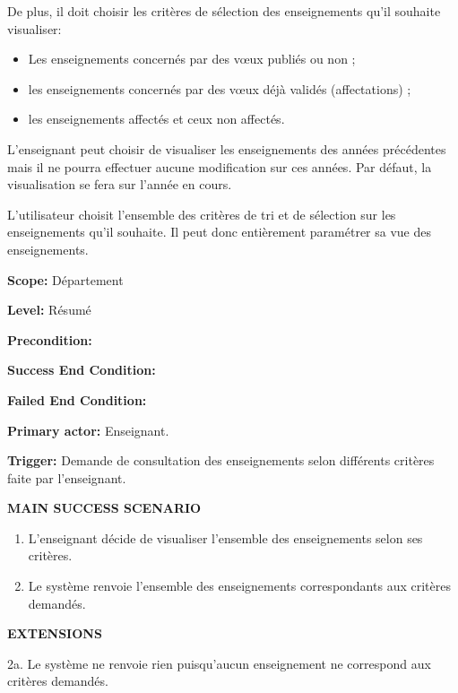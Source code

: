  De plus, il doit choisir les critères de sélection des enseignements qu'il souhaite visualiser:
 \begin{itemize}
 \item Les enseignements concernés par des v\oe ux publiés ou non ;
 \item les enseignements concernés par des v\oe ux déjà validés (affectations) ;
 \item les enseignements affectés et ceux non affectés.
 \end{itemize}

 L'enseignant peut choisir de visualiser les enseignements des années précédentes mais il ne pourra effectuer aucune modification sur ces années. Par défaut, la visualisation se fera sur l'année en cours.

 L'utilisateur choisit l'ensemble des critères de tri et de sélection sur les enseignements qu'il souhaite. Il peut donc entièrement paramétrer sa vue des enseignements.

 \noindent\textbf{Scope:}
 Département

 \noindent\textbf{Level:}
 Résumé

 \noindent\textbf{Precondition:}

 \noindent\textbf{Success End Condition:}

 \noindent\textbf{Failed End Condition:}

 \noindent\textbf{Primary actor:}
 Enseignant.

 \noindent\textbf{Trigger:}
 Demande de consultation des enseignements selon différents critères faite par l'enseignant.

 \noindent\textbf{MAIN SUCCESS SCENARIO}
 \begin{enumerate}
 \item L'enseignant décide de visualiser l'ensemble des enseignements selon ses critères.
 \item Le système renvoie l'ensemble des enseignements correspondants aux critères demandés.\\
 \end{enumerate}

 \noindent\textbf{EXTENSIONS}
 \begin{list}{}{}
 \item 2a. Le système ne renvoie rien puisqu'aucun enseignement ne correspond aux critères demandés.
 \end{list}



